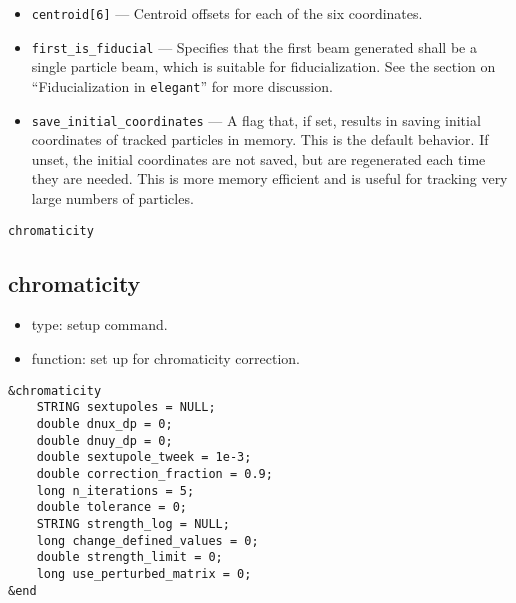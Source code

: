 \documentclass[11pt]{article}
\begin{document}
\begin{itemize}
\item \verb|centroid[6]| --- Centroid offsets for each of the six coordinates.

\item \verb|first_is_fiducial| --- Specifies that the first beam
generated shall be a single particle beam, which is suitable for
fiducialization.  See the section on ``Fiducialization in
\verb|elegant|'' for more discussion.

\item \verb|save_initial_coordinates| --- A flag that, if set, results
in saving initial coordinates of tracked particles in memory.  This is
the default behavior.  If unset, the initial coordinates are not
saved, but are regenerated each time they are needed.  This is more
memory efficient and is useful for tracking very large numbers of
particles.
\end{itemize}

\begin{latexonly}
\newpage
\begin{center}{\Large\verb|chromaticity|}\end{center}
\end{latexonly}
\subsection{chromaticity}

\begin{itemize}
\item type: setup command.
\item function: set up for chromaticity correction.
\end{itemize}

\begin{verbatim}
&chromaticity
    STRING sextupoles = NULL;
    double dnux_dp = 0;
    double dnuy_dp = 0;
    double sextupole_tweek = 1e-3;
    double correction_fraction = 0.9;
    long n_iterations = 5;
    double tolerance = 0;
    STRING strength_log = NULL;
    long change_defined_values = 0;
    double strength_limit = 0;
    long use_perturbed_matrix = 0;    
&end
\end{verbatim}
\end{document}
